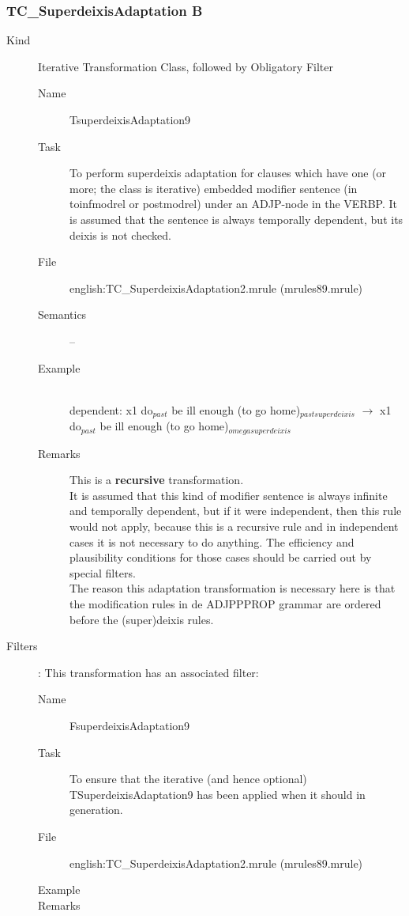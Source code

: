 \subsubsection{TC\_SuperdeixisAdaptation B}
\begin{description}
\item[Kind] Iterative Transformation Class, followed by Obligatory Filter

\vspace{1 cm}
\begin{description}
\item[Name] TsuperdeixisAdaptation9
\item[Task] To perform superdeixis adaptation for clauses which have one (or 
more; the class is iterative)
embedded modifier sentence (in toinfmodrel or postmodrel) under an 
ADJP-node in the VERBP. It is assumed that the sentence is 
always temporally dependent, but its deixis is not checked.
\item[File] english:TC\_SuperdeixisAdaptation2.mrule (mrules89.mrule)
\item[Semantics] --
\item[Example] \mbox{}\\
dependent: 
x1 do$_{past}$ be ill enough (to go home)$_{pastsuperdeixis}$ $\rightarrow$
x1 do$_{past}$ be ill enough (to go home)$_{omegasuperdeixis}$
\item[Remarks] This is a {\bf recursive} transformation.\\
It is assumed that this kind of modifier sentence is always 
infinite and temporally dependent, but if it were independent, then this rule 
would not apply, because this is a recursive rule and in independent cases 
it is not necessary to do anything. The efficiency and plausibility 
conditions for those cases should be carried out by special filters.\\
The reason this adaptation transformation is necessary here is 
that the modification rules in de ADJPPPROP grammar 
are ordered before the (super)deixis rules.
 
\end{description}
\item[Filters]: This transformation has an associated filter:
\vspace{1 cm}
\begin{description}
\item[Name] FsuperdeixisAdaptation9
\item[Task] To ensure that the iterative (and hence optional) 
TSuperdeixisAdaptation9 has been applied when it should in generation.
\item[File] english:TC\_SuperdeixisAdaptation2.mrule (mrules89.mrule)
\item[Example] 
\item[Remarks] 
\end{description}

\end{description}


